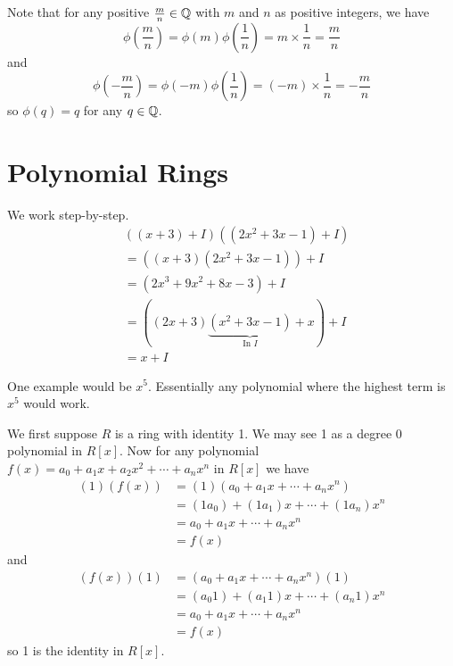 \begin{questions}
    Note that for any positive $\frac mn \in \mathbb{Q}$ with $m$ and $n$ as positive integers, we have
    \[
        \phi\left(\frac mn\right) = \phi(m)\phi\left(\frac1n\right) = m \times \frac1n = \frac mn
    \]
    and
    \[
        \phi\left(-\frac mn\right) = \phi(-m)\phi\left(\frac1n\right) = (-m) \times \frac1n = -\frac mn
    \]
    so $\phi(q) = q$ for any $q \in \mathbb{Q}$.
\end{questions}

\section{Polynomial Rings}
\begin{questions}
    \item We work step-by-step.
    \begin{align*}
        &\left((x + 3) + I\right)\left((2x^2 + 3x - 1) + I\right)\\
        &= \left((x + 3)(2x^2+3x-1)\right) + I\\
        &= \left(2x^3 + 9x^2 + 8x - 3\right) + I\\
        &= \left((2x+3)\underbrace{(x^2+3x-1)}_{\text{In }I} + x\right) + I\\
        &= x + I
    \end{align*}

    \item One example would be $x^5$. Essentially any polynomial where the highest term is $x^5$ would work.
    
    \item \begin{partquestions}{\alph*}
        \item We first suppose $R$ is a ring with identity 1. We may see 1 as a degree 0 polynomial in $R[x]$. Now for any polynomial $f(x) = a_0+a_1x+a_2x^2+\cdots+a_nx^n$ in $R[x]$ we have
        \begin{align*}
            (1)(f(x)) &= (1)(a_0+a_1x+\cdots+a_nx^n)\\
            &= (1a_0)+(1a_1)x+\cdots+(1a_n)x^n\\
            &= a_0+a_1x+\cdots+a_nx^n\\
            &= f(x)
        \end{align*}
        and
        \begin{align*}
            (f(x))(1) &= (a_0+a_1x+\cdots+a_nx^n)(1)\\
            &= (a_{0}1)+(a_{1}1)x+\cdots+(a_{n}1)x^n\\
            &= a_0+a_1x+\cdots+a_nx^n\\
            &= f(x)
        \end{align*}
        so 1 is the identity in $R[x]$.


\end{partquestions}
\end{questions}
